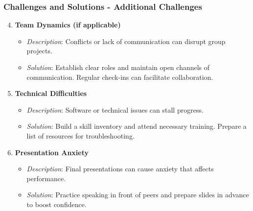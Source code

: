 \documentclass[aspectratio=169]{beamer}
\begin{document}
\begin{frame}[fragile]
    \frametitle{Challenges and Solutions - Additional Challenges}
    \begin{enumerate}
        \setcounter{enumi}{3} %
        \item \textbf{Team Dynamics (if applicable)}
        \begin{itemize}
            \item \textit{Description}: Conflicts or lack of communication can disrupt group projects.
            \item \textit{Solution}: Establish clear roles and maintain open channels of communication. Regular check-ins can facilitate collaboration.
        \end{itemize}

        \item \textbf{Technical Difficulties}
        \begin{itemize}
            \item \textit{Description}: Software or technical issues can stall progress.
            \item \textit{Solution}: Build a skill inventory and attend necessary training. Prepare a list of resources for troubleshooting.
        \end{itemize}

        \item \textbf{Presentation Anxiety}
        \begin{itemize}
            \item \textit{Description}: Final presentations can cause anxiety that affects performance.
            \item \textit{Solution}: Practice speaking in front of peers and prepare slides in advance to boost confidence.
        \end{itemize}
    \end{enumerate}
\end{frame}
\end{document}

